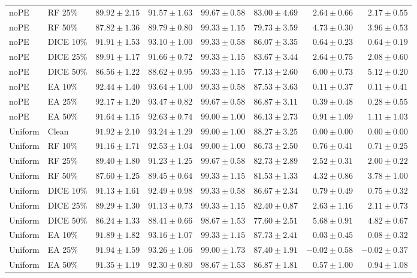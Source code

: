 {\begin{longtable}{llrrrrrr}
noPE & RF 25\% & $89.92\pm2.15$ & $91.57\pm1.63$ & $99.67\pm0.58$ & $83.00\pm4.69$ & $2.64\pm0.66$ & $2.17\pm0.55$ \\
noPE & RF 50\% & $87.82\pm1.36$ & $89.79\pm0.80$ & $99.33\pm1.15$ & $79.73\pm3.59$ & $4.73\pm0.30$ & $3.96\pm0.53$ \\
noPE & DICE 10\% & $91.91\pm1.53$ & $93.10\pm1.00$ & $99.33\pm0.58$ & $86.07\pm3.35$ & $0.64\pm0.23$ & $0.64\pm0.19$ \\
noPE & DICE 25\% & $89.91\pm1.17$ & $91.66\pm0.72$ & $99.33\pm1.15$ & $83.67\pm3.44$ & $2.64\pm0.75$ & $2.08\pm0.60$ \\
noPE & DICE 50\% & $86.56\pm1.22$ & $88.62\pm0.95$ & $99.33\pm1.15$ & $77.13\pm2.60$ & $6.00\pm0.73$ & $5.12\pm0.20$ \\
noPE & EA 10\% & $92.44\pm1.40$ & $93.64\pm1.00$ & $99.33\pm0.58$ & $87.53\pm3.63$ & $0.11\pm0.37$ & $0.11\pm0.41$ \\
noPE & EA 25\% & $92.17\pm1.20$ & $93.47\pm0.82$ & $99.67\pm0.58$ & $86.87\pm3.11$ & $0.39\pm0.48$ & $0.28\pm0.55$ \\
noPE & EA 50\% & $91.64\pm1.15$ & $92.63\pm0.74$ & $99.00\pm1.00$ & $86.13\pm2.73$ & $0.91\pm1.09$ & $1.11\pm1.03$ \\
Uniform & Clean & $91.92\pm2.10$ & $93.24\pm1.29$ & $99.00\pm1.00$ & $88.27\pm3.25$ & $0.00\pm0.00$ & $0.00\pm0.00$ \\
Uniform & RF 10\% & $91.16\pm1.71$ & $92.53\pm1.04$ & $99.00\pm1.00$ & $86.73\pm2.50$ & $0.76\pm0.41$ & $0.71\pm0.25$ \\
Uniform & RF 25\% & $89.40\pm1.80$ & $91.23\pm1.25$ & $99.67\pm0.58$ & $82.73\pm2.89$ & $2.52\pm0.31$ & $2.00\pm0.22$ \\
Uniform & RF 50\% & $87.60\pm1.25$ & $89.45\pm0.64$ & $99.33\pm1.15$ & $81.53\pm1.33$ & $4.32\pm0.86$ & $3.78\pm1.00$ \\
Uniform & DICE 10\% & $91.13\pm1.61$ & $92.49\pm0.98$ & $99.33\pm0.58$ & $86.67\pm2.34$ & $0.79\pm0.49$ & $0.75\pm0.32$ \\
Uniform & DICE 25\% & $89.29\pm1.30$ & $91.13\pm0.73$ & $99.33\pm1.15$ & $82.40\pm0.87$ & $2.63\pm1.16$ & $2.11\pm0.73$ \\
Uniform & DICE 50\% & $86.24\pm1.33$ & $88.41\pm0.66$ & $98.67\pm1.53$ & $77.60\pm2.51$ & $5.68\pm0.91$ & $4.82\pm0.67$ \\
Uniform & EA 10\% & $91.89\pm1.82$ & $93.16\pm1.07$ & $99.33\pm1.15$ & $87.73\pm2.41$ & $0.03\pm0.45$ & $0.08\pm0.32$ \\
Uniform & EA 25\% & $91.94\pm1.59$ & $93.26\pm1.06$ & $99.00\pm1.73$ & $87.40\pm1.91$ & $-0.02\pm0.58$ & $-0.02\pm0.37$ \\
Uniform & EA 50\% & $91.35\pm1.19$ & $92.30\pm0.80$ & $98.67\pm1.53$ & $86.87\pm1.81$ & $0.57\pm1.00$ & $0.94\pm1.08$ \\
\end{longtable}
}

